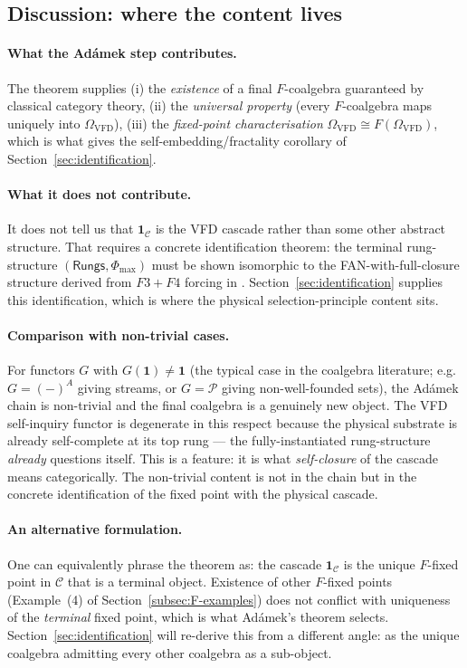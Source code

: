 \documentclass[11pt, a4paper]{amsart}
\theoremstyle{definition}
\newcommand{\Rungs}{\mathsf{Rungs}}
\newcommand{\catC}{\mathcal{C}}
\newcommand{\Omegacap}{\Omega_{\mathrm{VFD}}}
\begin{document}
\subsection{Discussion: where the content lives}

\paragraph{What the Ad\'amek step contributes.} The theorem
supplies (i) the \emph{existence} of a final $F$-coalgebra
guaranteed by classical category theory, (ii) the \emph{universal
property} (every $F$-coalgebra maps uniquely into $\Omegacap$),
(iii) the \emph{fixed-point characterisation}
$\Omegacap \cong F(\Omegacap)$, which is what gives the
self-embedding/fractality corollary of
Section~\ref{sec:identification}.

\paragraph{What it does not contribute.} It does not tell us that
$\mathbf{1}_\catC$ is the VFD cascade rather than some other
abstract structure. That requires a concrete identification
theorem: the terminal rung-structure $(\Rungs, \Phi_{\max})$
must be shown isomorphic to the FAN-with-full-closure structure
derived from $F3+F4$ forcing in
\cite{CascadeCompletenessAudit}. Section~\ref{sec:identification}
supplies this identification, which is where the physical
selection-principle content sits.

\paragraph{Comparison with non-trivial cases.} For functors
$G$ with $G(\mathbf{1}) \ne \mathbf{1}$ (the typical case in the
coalgebra literature; e.g.\ $G = (-)^A$ giving streams, or
$G = \mathcal{P}$ giving non-well-founded sets), the Ad\'amek
chain is non-trivial and the final coalgebra is a genuinely new
object. The VFD self-inquiry functor is degenerate in this
respect because the physical substrate is already self-complete
at its top rung — the fully-instantiated rung-structure
\emph{already} questions itself. This is a feature: it is what
\emph{self-closure} of the cascade means categorically. The
non-trivial content is not in the chain but in the concrete
identification of the fixed point with the physical cascade.

\paragraph{An alternative formulation.} One can equivalently
phrase the theorem as: the cascade $\mathbf{1}_\catC$ is the
unique $F$-fixed point in $\catC$ that is a terminal object.
Existence of other $F$-fixed points (Example~(4) of
Section~\ref{subsec:F-examples}) does not conflict with
uniqueness of the \emph{terminal} fixed point, which is what
Ad\'amek's theorem selects. Section~\ref{sec:identification}
will re-derive this from a different angle: as the unique
coalgebra admitting every other coalgebra as a sub-object.
\end{document}
